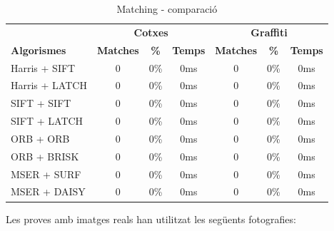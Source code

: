 		\begin{table}[H]
			\begin{center}
				\begin{tabular}{l | c c c | c c c}
					& \multicolumn{3}{c|}{\textbf{Cotxes}} & \multicolumn{3}{c}{\textbf{Graffiti}} \\
					\textbf{Algorismes} & \textbf{Matches} & \textbf{\%} & \textbf{Temps} & \textbf{Matches} & \textbf{\%} & \textbf{Temps} \\ \hline
					Harris + SIFT & 0 & 0\% & 0ms & 0 & 0\% & 0ms \\
					Harris + LATCH & 0 & 0\% & 0ms & 0 & 0\% & 0ms \\
					SIFT + SIFT & 0 & 0\% & 0ms & 0 & 0\% & 0ms \\
					SIFT + LATCH & 0 & 0\% & 0ms & 0 & 0\% & 0ms \\
					ORB + ORB & 0 & 0\% & 0ms & 0 & 0\% & 0ms \\
					ORB + BRISK & 0 & 0\% & 0ms & 0 & 0\% & 0ms \\
					MSER + SURF & 0 & 0\% & 0ms & 0 & 0\% & 0ms \\
					MSER + DAISY & 0 & 0\% & 0ms & 0 & 0\% & 0ms \\
				\end{tabular}
			\end{center}
			\caption{Matching - comparació}
		\end{table}
		\noindent
		Les proves amb imatges reals han utilitzat les següents fotografies:

